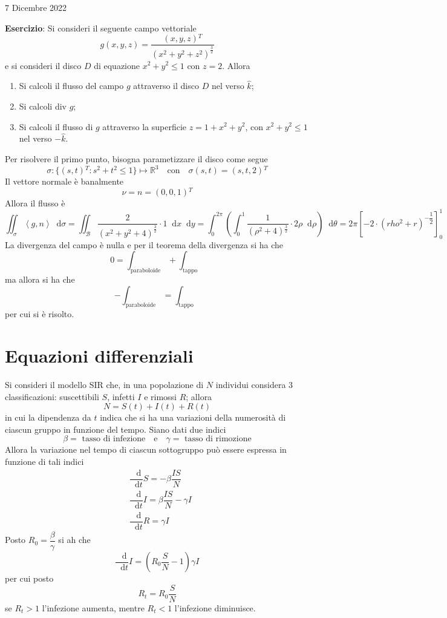 \documentclass[a4paper]{extarticle}
\newcommand*\dif{\mathop{}\!\mathrm{d}}
\begin{document}
\newpage
\noindent
\begin{center}
    7 Dicembre 2022
\end{center}
\vspace{1em}
\noindent
\textbf{Esercizio}: Si consideri il seguente campo vettoriale
\[g(x,y,z)=\dfrac{(x,y,z){^T}}{\left(x^2+y^2+z^2\right)^{\frac{3}{2}}}\]
e si consideri il disco $D$ di equazione $x^2+y^2 \leq 1$ con $z=2$. Allora
\begin{enumerate}
    \item Si calcoli il flusso del campo $g$ attraverso il disco $D$ nel verso $\hat k$;
    \item Si calcoli div $g$;
    \item Si calcoli il flusso di $g$ attraverso la superficie $z=1+x^2+y^2$, con $x^2+y^2 \leq 1$ nel verso $- \hat k$.
\end{enumerate}
Per risolvere il primo punto, bisogna parametizzare il disco come segue
\[\sigma : \{(s,t){^T} : s^2+t^2 \leq 1\} \longmapsto \mathbb{R}^3 \hspace{1em} \text{con} \hspace{1em} \sigma(s,t)=(s,t,2){^T}\]
Il vettore normale è banalmente
\[\nu=n=(0,0,1){^T}\]
Allora il flusso è
\[\iint_\sigma \left<g,n\right> \dif \sigma = \iint_\mathcal{B} \dfrac{2}{(x^2+y^2+4)^{\frac{3}{2}}} \cdot 1 \dif x \dif y = \int_0^{2\pi} \left(\int_0^1 \dfrac{1}{\left(\rho^2+4\right){^\frac{3}{2}}} \cdot 2\rho \dif \rho\right) \dif \theta = 2\pi \left[-2 \cdot \left(rho^2+r\right)^{-\dfrac{1}{2}}\right]_0^1\]
La divergenza del campo è nulla e per il teorema della divergenza si ha che
\[0 = \int_\text{paraboloide} + \int_\text{tappo}\]
ma allora si ha che
\[-\int_\text{paraboloide} = \int_\text{tappo}\]
per cui si è risolto.

\newpage
\section{Equazioni differenziali}
Si consideri il modello SIR che, in una popolazione di $N$ individui considera $3$ classificazioni: suscettibili $S$, infetti $I$ e rimossi $R$; allora
\[N=S(t)+I(t)+R(t)\]
in cui la dipendenza da $t$ indica che si ha una variazioni della numerosità di ciascun gruppo in funzione del tempo. Siano dati due indici
\[\beta=\text{ tasso di infezione} \hspace{1em} \text{e} \hspace{1em} \gamma=\text{ tasso di rimozione}\]
Allora la variazione nel tempo di ciascun sottogruppo può essere espressa in funzione di tali indici
\begin{align*}
    & \dfrac{\dif}{\dif t} S = - \beta \dfrac{IS}{N}\\
    & \dfrac{\dif}{\dif t} I = \beta \dfrac{IS}{N} - \gamma I\\
    & \dfrac{\dif}{\dif t} R = \gamma I
\end{align*}
Posto $R_0=\dfrac{\beta}{\gamma}$ si ah che
\[\dfrac{\dif}{\dif t} I = \left(R_0 \dfrac{S}{N} - 1\right) \gamma I\]
per cui posto
\[R_t=R_0 \dfrac{S}{N}\]
se $R_t > 1$ l'infezione aumenta, mentre $R_t < 1$ l'infezione diminuisce.
\end{document}
